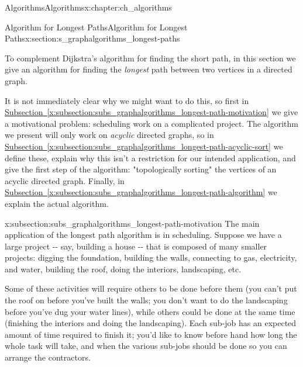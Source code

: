 \documentclass[oneside,10pt,]{book}
\newcommand{\xreffont}{\relax}
\numberwithin{equation}{section}
\begin{document}
\begin{chapterptx}{Algorithms}{}{Algorithms}{}{}{x:chapter:ch_algorithms}
\typeout{************************************************}
%
\begin{sectionptx}{Algorithm for Longest Paths}{}{Algorithm for Longest Paths}{}{}{x:section:s_graphalgorithms_longest-paths}
\begin{introduction}{}%
To complement Dijkstra's algorithm for finding the short path, in this section we give an algorithm for finding the \emph{longest} path between two vertices in a directed graph.%
\par
It is not immediately clear why we might want to do this, so first in \hyperref[x:subsection:subs_graphalgorithms_longest-path-motivation]{Subsection~{\xreffont\ref{x:subsection:subs_graphalgorithms_longest-path-motivation}}}   we give a motivational problem: scheduling work on a complicated project.  The algorithm we present will only work on \emph{acyclic} directed graphs, so in \hyperref[x:subsection:subs_graphalgorithms_longest-path-acyclic-sort]{Subsection~{\xreffont\ref{x:subsection:subs_graphalgorithms_longest-path-acyclic-sort}}} we define these, explain why this isn't a restriction for our intended application, and give the first step of the algorithm: "topologically sorting" the vertices of an acyclic directed graph.  Finally, in \hyperref[x:subsection:subs_graphalgorithms_longest-path-algorithm]{Subsection~{\xreffont\ref{x:subsection:subs_graphalgorithms_longest-path-algorithm}}}   we explain the actual algorithm.%
\end{introduction}%
%
%
\typeout{************************************************}
\typeout{************************************************}
%
\begin{subsectionptx}{}{}{}{}{}{x:subsection:subs_graphalgorithms_longest-path-motivation}
The main application of the longest path algorithm is in scheduling.  Suppose we have a large project -{}-{} say, building a house -{}-{} that is composed of many smaller projects: digging the foundation, building the walls, connecting to gas, electricity, and water, building the roof, doing the interiors, landscaping, etc.%
\par
Some of these activities will require others to be done before them (you can't put the roof on before you've built the walls; you don't want to do the landscaping before you've dug your water lines), while others could be done at the same time (finishing the interiors and doing the landscaping).  Each sub-job has an expected amount of time required to finish it; you'd like to know before hand how long the whole task will take, and when the various sub-jobs should be done so you can arrange the contractors.%

\end{subsectionptx}
\end{sectionptx}
\end{chapterptx}
\end{document}
